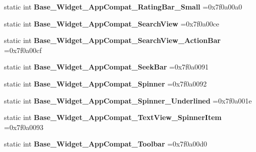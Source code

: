 \begin{DoxyCompactItemize}
static int {\bfseries Base\+\_\+\+Widget\+\_\+\+App\+Compat\+\_\+\+Rating\+Bar\+\_\+\+Small} =0x7f0a00a0
\item 
\mbox{\label{classandroid_1_1support_1_1v7_1_1appcompat_1_1R_1_1style_aa47a6b44769de7553ffb1245012ee90c}} 
static int {\bfseries Base\+\_\+\+Widget\+\_\+\+App\+Compat\+\_\+\+Search\+View} =0x7f0a00ce
\item 
\mbox{\label{classandroid_1_1support_1_1v7_1_1appcompat_1_1R_1_1style_a29e5e1f5118b070fde157b5c894fc0a8}} 
static int {\bfseries Base\+\_\+\+Widget\+\_\+\+App\+Compat\+\_\+\+Search\+View\+\_\+\+Action\+Bar} =0x7f0a00cf
\item 
\mbox{\label{classandroid_1_1support_1_1v7_1_1appcompat_1_1R_1_1style_af554580995a525f67c864726cbde9302}} 
static int {\bfseries Base\+\_\+\+Widget\+\_\+\+App\+Compat\+\_\+\+Seek\+Bar} =0x7f0a0091
\item 
\mbox{\label{classandroid_1_1support_1_1v7_1_1appcompat_1_1R_1_1style_a7d69c6ce212e61b13eeadf9d8971d9c3}} 
static int {\bfseries Base\+\_\+\+Widget\+\_\+\+App\+Compat\+\_\+\+Spinner} =0x7f0a0092
\item 
\mbox{\label{classandroid_1_1support_1_1v7_1_1appcompat_1_1R_1_1style_ac8dcca77fbbf23e4cbb66c9b3fe5439f}} 
static int {\bfseries Base\+\_\+\+Widget\+\_\+\+App\+Compat\+\_\+\+Spinner\+\_\+\+Underlined} =0x7f0a001e
\item 
\mbox{\label{classandroid_1_1support_1_1v7_1_1appcompat_1_1R_1_1style_a2da38c1dfa691f2b4bdb5d369fc025a8}} 
static int {\bfseries Base\+\_\+\+Widget\+\_\+\+App\+Compat\+\_\+\+Text\+View\+\_\+\+Spinner\+Item} =0x7f0a0093
\item 
\mbox{\label{classandroid_1_1support_1_1v7_1_1appcompat_1_1R_1_1style_a94a1a56f014b5a9e5cf4223f82f7a7c8}} 
static int {\bfseries Base\+\_\+\+Widget\+\_\+\+App\+Compat\+\_\+\+Toolbar} =0x7f0a00d0

\end{DoxyCompactItemize}
